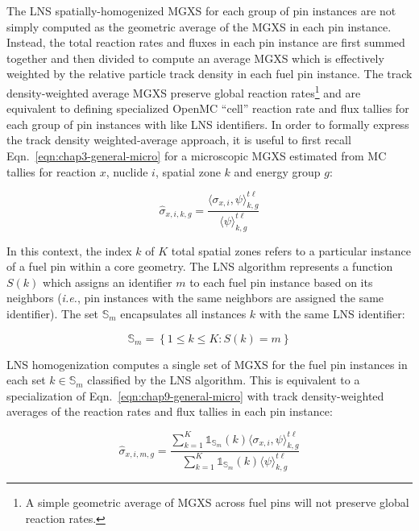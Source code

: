 The \ac{LNS} spatially-homogenized \ac{MGXS} for each group of pin instances are not simply computed as the geometric average of the \ac{MGXS} in each pin instance. Instead, the total reaction rates and fluxes in each pin instance are first summed together and then divided to compute an average \ac{MGXS} which is effectively weighted by the relative particle track density in each fuel pin instance. The track density-weighted average \ac{MGXS} preserve global reaction rates\footnote{A simple geometric average of \ac{MGXS} across fuel pins will not preserve global reaction rates.} and are equivalent to defining specialized OpenMC ``cell'' reaction rate and flux tallies for each group of pin instances with like \ac{LNS} identifiers. In order to formally express the track density weighted-average approach, it is useful to first recall Eqn.~\ref{eqn:chap3-general-micro} for a microscopic \ac{MGXS} estimated from \ac{MC} tallies for reaction $x$, nuclide $i$, spatial zone $k$ and energy group $g$:

\begin{equation}
\label{eqn:chap9-general-micro}
\hat{\sigma}_{x,i,k,g} = \frac{\langle \sigma_{x,i}, \psi \rangle_{k,g}^{t\ell}}{\langle \psi \rangle_{k,g}^{t\ell}}
\end{equation}

\noindent In this context, the index $k$ of $K$ total spatial zones refers to a particular instance of a fuel pin within a core geometry. The \ac{LNS} algorithm represents a function $S(k)$ which assigns an identifier $m$ to each fuel pin instance based on its neighbors (\textit{i.e.}, pin instances with the same neighbors are assigned the same identifier). The set $\mathbb{S}_{m}$ encapsulates all instances $k$  with the same \ac{LNS} identifier:

\begin{equation}
\label{eqn:chap9-lns-set}
\mathbb{S}_{m} = \left\{1 \le k \le K: S(k) = m\right\}
\end{equation}

\ac{LNS} homogenization computes a single set of \ac{MGXS} for the fuel pin instances in each set $k \in \mathbb{S}_{m}$ classified by the \ac{LNS} algorithm. This is equivalent to a specialization of Eqn.~\ref{eqn:chap9-general-micro} with track density-weighted averages of the reaction rates and flux tallies in each pin instance:

\begin{equation}
\label{eqn:chap9-lns-micro}
\hat{\sigma}_{x,i,m,g} = \frac{\displaystyle\sum\limits_{k=1}^{K}\mathbb{1}_{\mathbb{S}_{m}}(k) \langle \sigma_{x,i}, \psi \rangle_{k,g}^{t\ell}}{\displaystyle\sum\limits_{k=1}^{K}\mathbb{1}_{\mathbb{S}_{m}}(k) \langle \psi \rangle_{k,g}^{t\ell}}
\end{equation}

